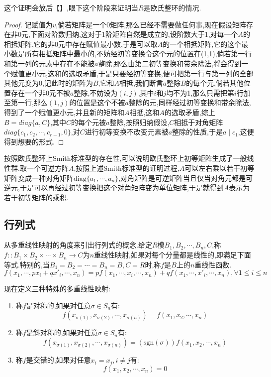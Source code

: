 这个证明会放后【】,眼下这个阶段来证明当$R$是欧氏整环的情况.
\begin{proof}
	
	记赋值为$v$,倘若矩阵是一个0矩阵,那么已经不需要做任何事,现在假设矩阵存在非0元,下面对阶数归纳,这对于1阶矩阵自然是成立的,设阶数大于1,对每一个$A$的相抵矩阵,它的非0元中存在赋值最小数,于是可以取$A$的一个相抵矩阵,它的这个最小数是所有相抵矩阵中最小的,不妨经初等变换令这个元的位置在(1,1),倘若第一行和第一列的元素中存在不能被$a$整除,那么由第二初等变换和带余除法,将会得到一个赋值更小元,这和的选取矛盾,于是只要经初等变换,便可把第一行与第一列的全部其他元变为0,记此时的矩阵为$B$,它和$A$相抵,我们断言$a$整除$B$的每个元,倘若其他位置存在一个非0元不被$a$整除,不妨设为$(i,j)$,其中$i$和$j$均不为1,那么只需把第$i$行加至第一行,那么$(1,j)$的位置是这个不被$a$整除的元,同样经过初等变换和带余除法,得到了一个赋值更小元,并且新的矩阵和$A$相抵,这和$A$的选取矛盾,综上$B=diag\{a,C\}$,其中$C$的每个元被$a$整除,按照归纳假设,$C$相抵于对角矩阵$diag\{c_1,c_2,\cdots,c_{r-1},0\}$,对$C$进行初等变换不改变元素被$a$整除的性质,于是$a\mid c_1$,这便得到想要的形式.
\end{proof}

按照欧氏整环上Smith标准型的存在性,可以说明欧氏整环上初等矩阵生成了一般线性群.取一个可逆方阵$A$,按照上述Smith标准型的证明过程,$A$可以左右乘以若干初等矩阵变成一种对角矩阵$\mathrm{diag}\{a_1,\cdots,a_n\}$,对角矩阵是可逆矩阵当且仅当对角元都是可逆元,于是可以再经过初等变换把这个对角矩阵变为单位矩阵,于是就得到$A$表示为若干初等矩阵的乘积.
\newpage
\subsection{行列式}

从多重线性映射的角度来引出行列式的概念.给定$R$模$B_1,B_2,\cdots,B_n,C$,称$f::B_1\times B_2\times\cdots\times B_n\to C$为$n$重线性映射,如果对每个分量都是线性的,即满足下面等式.特别的,当$B_1=B_2=\cdots=B_n=B,C=R$时,称$f$是$B$上的$n$重线性函数.
$$f(x_1,\cdots,px_{i}+qx'_{i},\cdots,x_n)=pf(x_1,\cdots,x_{i},\cdots,x_n)
+qf(x_1,\cdots,x'_{i},\cdots,x_n),\forall 1\le i\le n$$

现在定义三种特殊的多重线性映射:
\begin{enumerate}
	\item 称$f$是对称的,如果对任意$\sigma\in S_n$有:
	$$f(x_{\sigma(1)},x_{\sigma(2)},\cdots,x_{\sigma(n)})=
	f(x_1,x_2,\cdots,x_n)$$
	\item 称$f$是斜对称的,如果对任意$\sigma\in S_n$有:
	$$f(x_{\sigma(1)},x_{\sigma(2)},\cdots,x_{\sigma(n)})=(\mathrm{sgn}(\sigma))
	f(x_1,x_2,\cdots,x_n)$$
	\item 称$f$是交错的,如果对任意$x_i=x_j,i\not=j$有:
	$$f(x_1,x_2,\cdots,x_n)=0$$
\end{enumerate}

